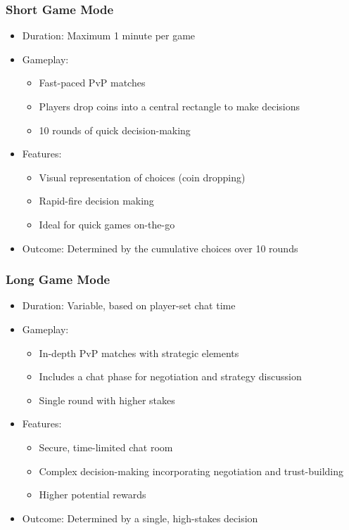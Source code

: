 \documentclass[]{article}
\begin{document}
\hypertarget{short-game-mode}{%
\subsubsection{Short Game Mode}\label{short-game-mode}}

\begin{itemize}
\tightlist
\item
  Duration: Maximum 1 minute per game
\item
  Gameplay:

  \begin{itemize}
  \tightlist
  \item
    Fast-paced PvP matches
  \item
    Players drop coins into a central rectangle to make decisions
  \item
    10 rounds of quick decision-making
  \end{itemize}
\item
  Features:

  \begin{itemize}
  \tightlist
  \item
    Visual representation of choices (coin dropping)
  \item
    Rapid-fire decision making
  \item
    Ideal for quick games on-the-go
  \end{itemize}
\item
  Outcome: Determined by the cumulative choices over 10 rounds
\end{itemize}

\hypertarget{long-game-mode}{%
\subsubsection{Long Game Mode}\label{long-game-mode}}

\begin{itemize}
\tightlist
\item
  Duration: Variable, based on player-set chat time
\item
  Gameplay:

  \begin{itemize}
  \tightlist
  \item
    In-depth PvP matches with strategic elements
  \item
    Includes a chat phase for negotiation and strategy discussion
  \item
    Single round with higher stakes
  \end{itemize}
\item
  Features:

  \begin{itemize}
  \tightlist
  \item
    Secure, time-limited chat room
  \item
    Complex decision-making incorporating negotiation and trust-building
  \item
    Higher potential rewards
  \end{itemize}
\item
  Outcome: Determined by a single, high-stakes decision
\end{itemize}
\end{document}
